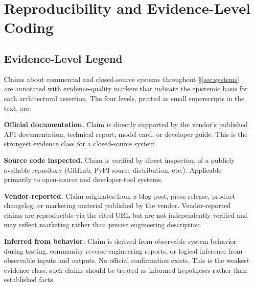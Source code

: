 
\appendix

\section{Reproducibility and Evidence-Level Coding}
\label{sec:appendix-evidence}

\subsection{Evidence-Level Legend}
\label{sec:appendix-legend}

Claims about commercial and closed-source systems throughout
\S\ref{sec:systems} are annotated with evidence-quality markers that
indicate the epistemic basis for each architectural assertion.  The four
levels, printed as small superscripts in the text, are:

\begin{description}[leftmargin=2em, labelwidth=1.6em, nosep, font=\normalfont]
  \item[\texttt{[D]}] \textbf{Official documentation.}
    Claim is directly supported by the vendor's published API
    documentation, technical report, model card, or developer guide.
    This is the strongest evidence class for a closed-source system.

  \item[\texttt{[S]}] \textbf{Source code inspected.}
    Claim is verified by direct inspection of a publicly available
    repository (GitHub, PyPI source distribution, etc.).  Applicable
    primarily to open-source and developer-tool systems.

  \item[\texttt{[V]}] \textbf{Vendor-reported.}
    Claim originates from a blog post, press release, product
    changelog, or marketing material published by the vendor.
    Vendor-reported claims are reproducible via the cited URL but are
    not independently verified and may reflect marketing rather than
    precise engineering description.

  \item[\texttt{[I]}] \textbf{Inferred from behavior.}
    Claim is derived from observable system behavior during testing,
    community reverse-engineering reports, or logical inference from
    observable inputs and outputs.  No official confirmation exists.
    This is the weakest evidence class; such claims should be treated
    as informed hypotheses rather than established facts.
\end{description}

